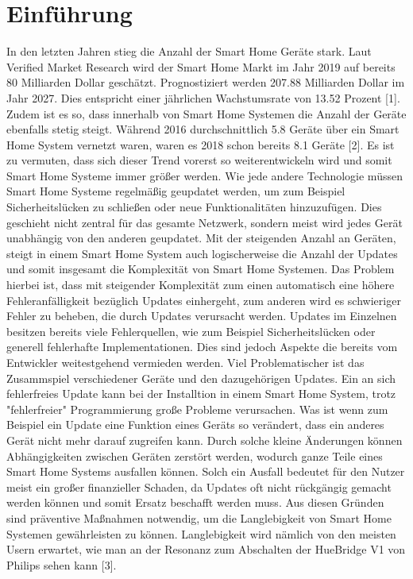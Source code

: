 \chapter{Einführung}

In den letzten Jahren stieg die Anzahl der Smart Home Geräte stark. Laut Verified Market Research wird
der Smart Home Markt im Jahr 2019 auf bereits 80 Milliarden Dollar geschätzt. Prognostiziert werden 207.88 
Milliarden Dollar im Jahr 2027. Dies entspricht einer jährlichen Wachstumsrate von 13.52 Prozent [1].
Zudem ist es so, dass innerhalb von Smart Home Systemen die Anzahl der Geräte ebenfalls stetig steigt. Während 2016
durchschnittlich 5.8 Geräte über ein Smart Home System vernetzt waren, waren es 2018 schon bereits 8.1 Geräte [2]. 
Es ist zu vermuten, dass sich dieser Trend vorerst so weiterentwickeln wird und somit Smart Home Systeme immer
größer werden. Wie jede andere Technologie müssen Smart Home Systeme regelmäßig geupdatet werden, um zum Beispiel
Sicherheitslücken zu schließen oder neue Funktionalitäten hinzuzufügen. Dies geschieht nicht zentral für das gesamte 
Netzwerk, sondern meist wird jedes Gerät unabhängig von den anderen geupdatet.
 Mit der steigenden Anzahl an Geräten, steigt in einem Smart Home System auch logischerweise die Anzahl der Updates und somit 
insgesamt die Komplexität von Smart Home Systemen. Das Problem hierbei ist, dass mit steigender Komplexität zum einen automatisch eine höhere
Fehleranfälligkeit bezüglich Updates einhergeht, zum anderen wird es schwieriger Fehler zu beheben,
die durch Updates verursacht werden. Updates im Einzelnen besitzen bereits viele Fehlerquellen, wie zum Beispiel Sicherheitslücken 
oder generell fehlerhafte Implementationen. Dies sind jedoch Aspekte die bereits vom Entwickler weitestgehend vermieden werden.
Viel Problematischer ist das Zusammspiel verschiedener Geräte und den dazugehörigen Updates. Ein an sich fehlerfreies Update
kann bei der Installtion in einem Smart Home System, trotz "fehlerfreier" Programmierung große Probleme verursachen. Was ist wenn zum Beispiel 
ein Update eine Funktion eines Geräts so verändert, dass ein anderes Gerät nicht mehr darauf zugreifen kann. Durch solche kleine Änderungen
können Abhängigkeiten zwischen Geräten zerstört werden, wodurch ganze Teile eines Smart Home Systems ausfallen
können. Solch ein Ausfall bedeutet für den Nutzer meist ein großer finanzieller Schaden, da Updates oft nicht 
rückgängig gemacht werden können und somit Ersatz beschafft werden muss.
Aus diesen Gründen sind präventive Maßnahmen notwendig,  um die Langlebigkeit von Smart Home Systemen gewährleisten zu können.
Langlebigkeit wird nämlich von den meisten Usern erwartet, wie man an der Resonanz zum Abschalten der HueBridge V1 von Philips sehen kann 
[3].






